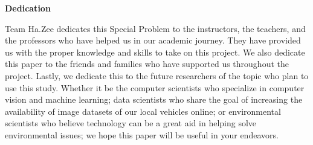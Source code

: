 \thispagestyle{empty}
\begin{center}
	\textbf{Dedication}
\end{center}

Team Ha.Zee dedicates this Special Problem to the instructors, the teachers, and the professors who have helped us in our academic journey. They have provided us with the proper knowledge and skills to take on this project. We also dedicate this paper to the friends and families who have supported us throughout the project. Lastly, we dedicate this to the future researchers of the topic who plan to use this study. Whether it be the computer scientists who specialize in computer vision and machine learning; data scientists who share the goal of increasing the availability of image datasets of our local vehicles online; or environmental scientists who believe technology can be a great aid in helping solve environmental issues; we hope this paper will be useful in your endeavors.
